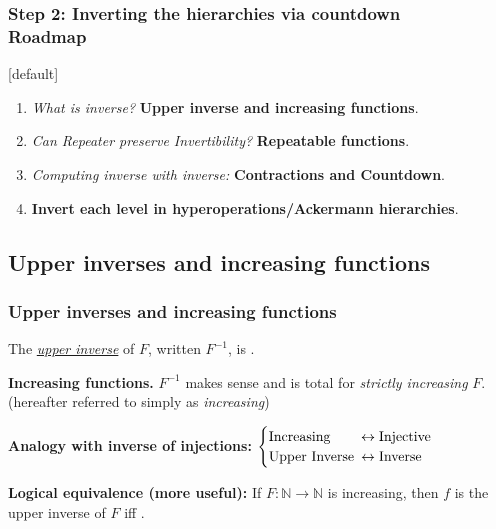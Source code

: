 \begin{frame}
\frametitle{Step 2: Inverting the hierarchies via countdown\\ Roadmap}
[default]

\begin{enumerate}[\bfseries 1.]
	\itemsep 3ex
	\pause
	\item<come@6->
	\emph{What is inverse?} \textbf{Upper inverse and increasing functions}.
	
	\item<3->
	\emph{Can Repeater preserve Invertibility?} \textbf{Repeatable functions}.
	
	\item<4->
	\emph{Computing inverse with inverse:} \textbf{Contractions and Countdown}.
	
	\item<5->
	\textbf{Invert each level in hyperoperations/Ackermann hierarchies}.
\end{enumerate}
\end{frame}


\subsection{Upper inverses and increasing functions}

\begin{frame}
\frametitle{Upper inverses and increasing functions}
The \href{https://github.com/inv-ack/inv-ack/blob/7270e64a2600b771f2b1b1b151f7d13fb2ae6c97/inverse.v\#L28-L45}{
	\emph{upper inverse}} of $F$, written $F^{-1}$,
is .


\bigskip

\textbf{Increasing functions.} $F^{-1}$ makes sense and is total for \emph{strictly increasing} $F$. (hereafter referred to simply as \emph{increasing})

\bigskip

\textbf{Analogy with inverse of injections:} $\begin{cases}
\text{Increasing} & \hspace{-0.5em}\leftrightarrow \text{Injective} \\
\text{Upper Inverse} & \hspace{-0.5em}\leftrightarrow \text{Inverse}
\end{cases}$

\bigskip

\textbf{Logical equivalence (more useful):}
\href{https://github.com/inv-ack/inv-ack/blob/7270e64a2600b771f2b1b1b151f7d13fb2ae6c97/inverse.v\#L65-L77}{\coq} If $F:\mathbb{N}\to \mathbb{N}$ is increasing, then $f$ is the upper inverse of $F$ iff .

\end{frame}

